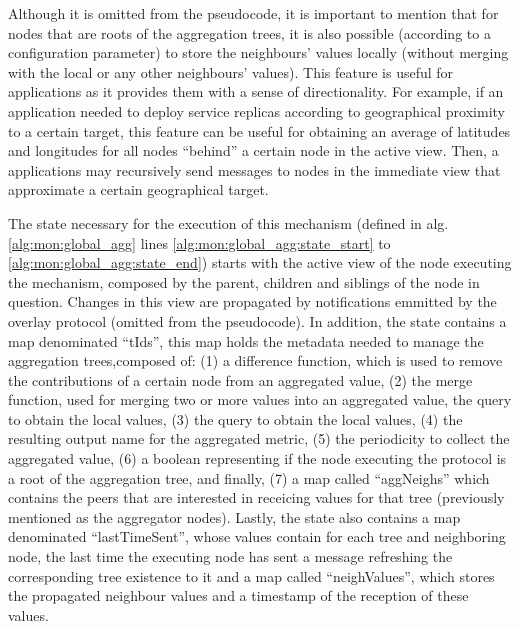 Although it is omitted from the pseudocode, it is important to mention that for nodes that are roots of the aggregation trees, it is also possible (according to a configuration parameter) to store the neighbours' values locally (without merging with the local or any other neighbours' values). This feature is useful for applications as it provides them with a sense of directionality. For example, if an application needed to deploy service replicas according to geographical proximity to a certain target, this feature can be useful for obtaining an average of latitudes and longitudes for all nodes ``behind'' a certain node in the active view. Then, a applications may recursively send messages to nodes in the immediate view that approximate a certain geographical target. 



The state necessary for the execution of this mechanism (defined in alg. \ref{alg:mon:global_agg} lines \ref{alg:mon:global_agg:state_start} to \ref{alg:mon:global_agg:state_end}) starts with the active view of the node executing the mechanism, composed by the parent, children and siblings of the node in question. Changes in this view are propagated by notifications emmitted by the overlay protocol (omitted from the pseudocode). In addition, the state contains a map denominated ``tIds'',  this map holds the metadata needed to manage the aggregation trees,composed of: (1) a difference function, which is used to remove the contributions of a certain node from an aggregated value, (2) the merge function, used for merging two or more values into an aggregated value, the query to obtain the local values, (3) the query to obtain the local values, (4) the resulting output name for the aggregated metric, (5) the periodicity to collect the aggregated value, (6) a boolean representing if the node executing the protocol is a root of the aggregation tree, and finally, (7) a map called ``aggNeighs'' which contains the peers that are interested in receicing values for that tree (previously mentioned as the aggregator nodes). Lastly, the state also contains a map denominated ``lastTimeSent'', whose values contain for each tree and neighboring node, the last time the executing node has sent a message refreshing the corresponding tree existence to it and a map called ``neighValues'', which stores the propagated neighbour values and a timestamp of the reception of these values. 

